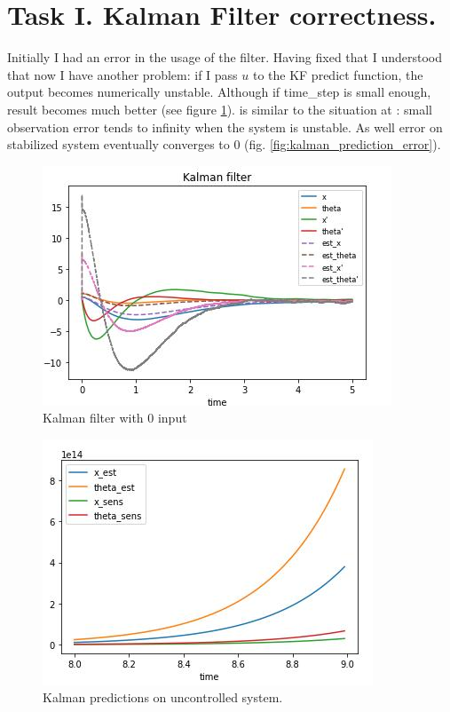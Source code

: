 \documentclass[12pt,letterpaper]{article}
\begin{document}
    

\section*{Task I. Kalman Filter correctness.}
\label{Q:I}
    
    Initially I had an error in the usage of the filter. Having fixed that I understood that now I have another problem: if I pass $u$ to the KF predict function, the output becomes numerically unstable. Although if time\_step is small enough, result becomes much better (see figure \ref{fig:output_noise_0005_filtered}).  is similar to the situation at : small observation error tends to infinity when the system is unstable. As well error on stabilized system eventually converges to 0 (fig. \ref{fig:kalman_prediction_error}).
    
    
    \begin{figure}[htb]
    \centering
        \includegraphics[width=0.5\linewidth]{images/filter/kalman.jpg}
    \caption{Kalman filter with 0 input}
    \label{fig:output_noise_0005_filtered}
    \end{figure}
    
    \begin{figure}[htb]
        \centering
        \includegraphics[width=0.5\linewidth]{images/filter/kalman_uncontrolled.jpg}
        \caption{Kalman predictions on uncontrolled system.}
        \label{fig:kalman_uncontrolled}
    \end{figure}
    
\end{document}
